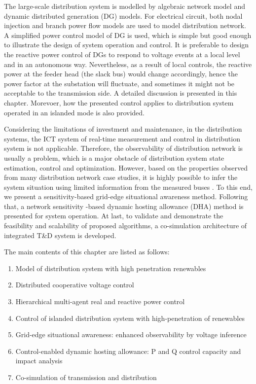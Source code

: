 \documentclass{article}
\begin{document}
The large-scale distribution system is modelled by algebraic network model and dynamic distributed generation (DG) models. For electrical circuit, both nodal injection and branch power flow models are used to model distribution network. A simplified power control model \cite{xin2011co} of DG is used, which is simple but good enough to illustrate the design of system operation and control. 
It is preferable to design the reactive power control of DGs to respond to voltage events at a local level and in an autonomous way. Nevertheless, as a result of local controls, the reactive power at the feeder head (the slack bus) would change accordingly, hence the power factor at the substation will fluctuate, and sometimes it might not be acceptable to the transmission side. A detailed discussion is presented in this chapter. Morevoer, how the presented control applies to distribution system operated in an islanded mode is also provided.

Considering the limitations of investment and maintenance, in the distribution systems, the ICT system of real-time measurement and control in distribution system is not applicable. Therefore, the observability of distribution network is usually a problem, which is a major obstacle of distribution system state estimation, control and optimization. However, based on the properties observed from many distribution network case studies, it is highly possible to infer the system situation using limited information from the measured buses \cite{xu2019data}. To this end, we present a sensitivity-based grid-edge situational awareness method.  
Following that, a network sensitivity -based dynamic hosting allowance (DHA) method is presented for system operation. At last, to validate and demonstrate the feasibility and scalability of proposed algorithms, a co-simulation architecture of integrated T\&D system is developed.

The main contents of this chapter are listed as follows:
\begin{enumerate}[label=$-$]
    \item Model of distribution system with high penetration renewables 
    \item Distributed cooperative voltage control
    \item Hierarchical multi-agent real and reactive power control
    \item Control of islanded distribution system with high-penetration of renewables
    \item Grid-edge situational awareness: enhanced observability by voltage inference
    \item Control-enabled dynamic hosting allowance: P and Q control capacity and impact analysis
    \item Co-simulation of transmission and distribution 
\end{enumerate}
\end{document}
